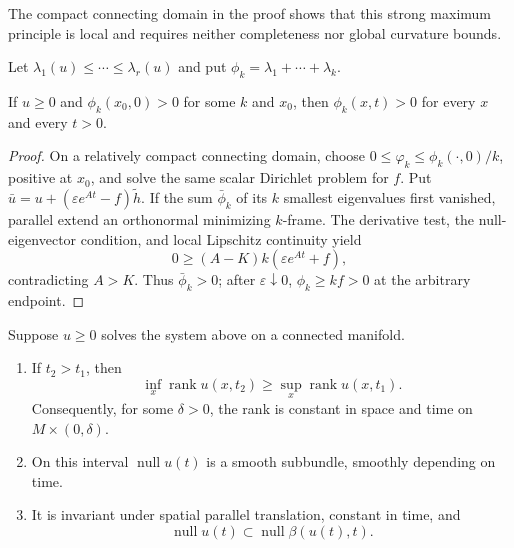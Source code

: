 \begin{remark}
\label{rem:system-strong-maximum-principle-locality}


The compact connecting domain in the proof shows that this strong maximum
principle is local and requires neither completeness nor global curvature
bounds.
\end{remark}

Let $\lambda_1(u)\leq\cdots\leq\lambda_r(u)$ and put
$\phi_k=\lambda_1+\cdots+\lambda_k$.

\begin{proposition}
\label{prop:system-strong-maximum-principle-eigenvalue-sums}

If $u\geq0$ and $\phi_k(x_0,0)>0$ for some $k$ and $x_0$, then
$\phi_k(x,t)>0$ for every $x$ and every $t>0$.
\end{proposition}

\begin{proof}
\sketch
{}
On a relatively compact connecting domain, choose
$0\leq\varphi_k\leq\phi_k(\cdot,0)/k$, positive at $x_0$, and solve the same
scalar Dirichlet problem for $f$.  Put
$\bar u=u+(\varepsilon e^{At}-f)\widetilde h$.  If the sum $\bar\phi_k$ of
its $k$ smallest eigenvalues first vanished, parallel extend an orthonormal
minimizing $k$-frame.  The derivative test, the null-eigenvector condition,
and local Lipschitz continuity yield
\[
0\geq (A-K)k(\varepsilon e^{At}+f),
\]
contradicting $A>K$.  Thus $\bar\phi_k>0$; after
$\varepsilon\downarrow0$, $\phi_k\geq kf>0$ at the arbitrary endpoint.
\end{proof}

\begin{theorem}
\label{thm:system-null-space-rigidity}

Suppose $u\geq0$ solves the system above on a connected manifold.
\begin{enumerate}
\item If $t_2>t_1$, then
\[
\inf_x\operatorname{rank}u(x,t_2)
\geq\sup_x\operatorname{rank}u(x,t_1).
\]
Consequently, for some $\delta>0$, the rank is constant in space and time on
$M\times(0,\delta)$.
\item On this interval $\operatorname{null}u(t)$ is a smooth subbundle,
smoothly depending on time.
\item It is invariant under spatial parallel translation, constant in time,
and
\[
\operatorname{null}u(t)\subset
\operatorname{null}\beta(u(t),t).
\]
\end{enumerate}
\end{theorem}

